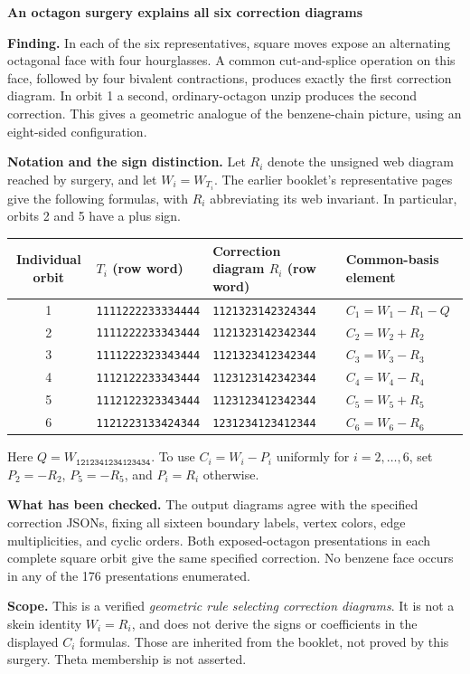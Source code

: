\documentclass[11pt]{article}
\newcommand{\word}[1]{\texttt{#1}}
\newcommand{\heading}[1]{{\Large\bfseries\color{ink}#1}\par}
\begin{document}
\heading{An octagon surgery explains all six correction diagrams}
\textbf{Finding.} In each of the six representatives, square moves expose an
alternating octagonal face with four hourglasses. A common cut-and-splice
operation on this face, followed by four bivalent contractions, produces exactly
the first correction diagram. In orbit 1 a second, ordinary-octagon unzip
produces the second correction. This gives a geometric analogue of the
benzene-chain picture, using an eight-sided configuration.

\textbf{Notation and the sign distinction.} Let $R_i$ denote the unsigned web
diagram reached by surgery, and let $W_i=W_{T_i}$. The earlier booklet's
representative pages give the following formulas, with $R_i$ abbreviating its
web invariant. In particular, orbits 2 and 5 have a plus sign.
\begin{center}\small
\begin{tabular}{clll}
\toprule
Individual orbit & $T_i$ (row word) & Correction diagram $R_i$ (row word) & Common-basis element\\
\midrule
1 & \word{1111222233334444} & \word{1121323142324344} & $C_1=W_1-R_1-Q$\\
2 & \word{1111222233343444} & \word{1121323142342344} & $C_2=W_2+R_2$\\
3 & \word{1111222323343444} & \word{1121323412342344} & $C_3=W_3-R_3$\\
4 & \word{1112122233343444} & \word{1123123142342344} & $C_4=W_4-R_4$\\
5 & \word{1112122323343444} & \word{1123123412342344} & $C_5=W_5+R_5$\\
6 & \word{1121223133424344} & \word{1231234123412344} & $C_6=W_6-R_6$\\
\bottomrule
\end{tabular}\end{center}
Here $Q=W_{\word{1212341234123434}}$. To use $C_i=W_i-P_i$ uniformly for
$i=2,\ldots,6$, set $P_2=-R_2$, $P_5=-R_5$, and $P_i=R_i$ otherwise.

\textbf{What has been checked.} The output diagrams agree with the specified
correction JSONs, fixing all sixteen boundary labels, vertex colors, edge
multiplicities, and cyclic orders. Both exposed-octagon presentations in each
complete square orbit give the same specified correction. No benzene face
occurs in any of the 176 presentations enumerated.

\textbf{Scope.} This is a verified \emph{geometric rule selecting correction
diagrams}. It is not a skein identity $W_i=R_i$, and does not derive the signs or
coefficients in the displayed $C_i$ formulas. Those are inherited from the
booklet, not proved by this surgery. Theta membership is not asserted.
\end{document}
